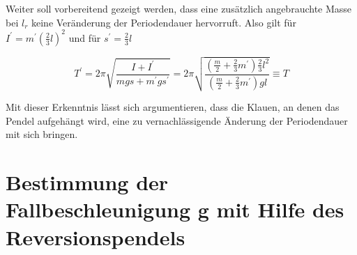Weiter soll vorbereitend gezeigt werden, dass eine zusätzlich angebrauchte Masse bei $l_r$  keine Veränderung der Periodendauer hervorruft. Also gilt für $I^\prime = m^\prime (\frac{2}{3}l)^2$ und für $s^\prime = \frac{2}{3}l$

\begin{equation}
    T^\prime = 2 \pi \sqrt{\frac{I + I^\prime}{mgs+m^\prime g s^\prime }} = 2\pi \sqrt{ \frac{ (\frac{m}{2} + \frac{2}{3} m^\prime) \frac{2}{3}l^2} { (\frac{m}{2} + \frac{2}{3}m^\prime)g l  }} \equiv T
\end{equation}

Mit dieser Erkenntnis lässt sich argumentieren, dass die Klauen, an denen das Pendel aufgehängt wird, eine zu vernachlässigende Änderung der Periodendauer mit sich bringen.

\section{Bestimmung der Fallbeschleunigung g mit Hilfe des Reversionspendels}


